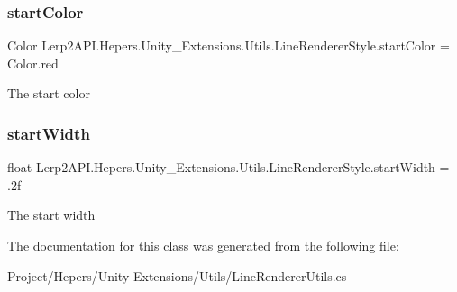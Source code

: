 \subsubsection{\texorpdfstring{start\+Color}{startColor}}
{\footnotesize\ttfamily Color Lerp2\+A\+P\+I.\+Hepers.\+Unity\+\_\+\+Extensions.\+Utils.\+Line\+Renderer\+Style.\+start\+Color = Color.\+red}



The start color 

\mbox{\label{class_lerp2_a_p_i_1_1_hepers_1_1_unity___extensions_1_1_utils_1_1_line_renderer_style_a20a99bbf0becd29f28cb6b477a5dc47c}} 
\subsubsection{\texorpdfstring{start\+Width}{startWidth}}
{\footnotesize\ttfamily float Lerp2\+A\+P\+I.\+Hepers.\+Unity\+\_\+\+Extensions.\+Utils.\+Line\+Renderer\+Style.\+start\+Width = .\+2f}



The start width 



The documentation for this class was generated from the following file\+:\begin{DoxyCompactItemize}
\item 
Project/\+Hepers/\+Unity Extensions/\+Utils/Line\+Renderer\+Utils.\+cs\end{DoxyCompactItemize}
